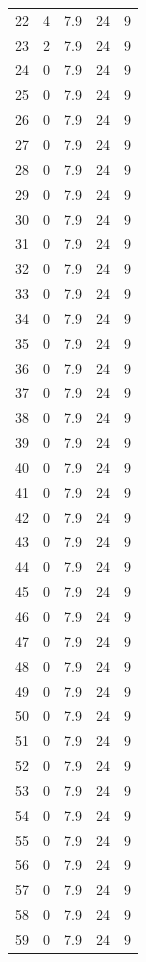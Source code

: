 \documentclass[utf8]{FrontiersinHarvard} %
\begin{document}
\begin{table}[t]
\begin{center}
\begin{tabular}{| c | c | c | c | c | }
    22 & 4 & 7.9 & 24 & 9 \\
    23 & 2 & 7.9 & 24 & 9 \\
    24 & 0 & 7.9 & 24 & 9 \\
    25 & 0 & 7.9 & 24 & 9 \\
    26 & 0 & 7.9 & 24 & 9 \\
    27 & 0 & 7.9 & 24 & 9 \\
    28 & 0 & 7.9 & 24 & 9 \\
    29 & 0 & 7.9 & 24 & 9 \\
    30 & 0 & 7.9 & 24 & 9 \\
    31 & 0 & 7.9 & 24 & 9 \\
    32 & 0 & 7.9 & 24 & 9 \\
    33 & 0 & 7.9 & 24 & 9 \\
    34 & 0 & 7.9 & 24 & 9 \\
    35 & 0 & 7.9 & 24 & 9 \\
    36 & 0 & 7.9 & 24 & 9 \\
    37 & 0 & 7.9 & 24 & 9 \\
    38 & 0 & 7.9 & 24 & 9 \\
    39 & 0 & 7.9 & 24 & 9 \\
    40 & 0 & 7.9 & 24 & 9 \\
    41 & 0 & 7.9 & 24 & 9 \\
    42 & 0 & 7.9 & 24 & 9 \\
    43 & 0 & 7.9 & 24 & 9 \\
    44 & 0 & 7.9 & 24 & 9 \\
    45 & 0 & 7.9 & 24 & 9 \\
    46 & 0 & 7.9 & 24 & 9 \\
    47 & 0 & 7.9 & 24 & 9 \\
    48 & 0 & 7.9 & 24 & 9 \\
    49 & 0 & 7.9 & 24 & 9 \\
    50 & 0 & 7.9 & 24 & 9 \\
    51 & 0 & 7.9 & 24 & 9 \\
    52 & 0 & 7.9 & 24 & 9 \\
    53 & 0 & 7.9 & 24 & 9 \\
    54 & 0 & 7.9 & 24 & 9 \\
    55 & 0 & 7.9 & 24 & 9 \\
    56 & 0 & 7.9 & 24 & 9 \\
    57 & 0 & 7.9 & 24 & 9 \\
    58 & 0 & 7.9 & 24 & 9 \\
    59 & 0 & 7.9 & 24 & 9 \\

\end{tabular}
\end{center}
\end{table}
\end{document}
